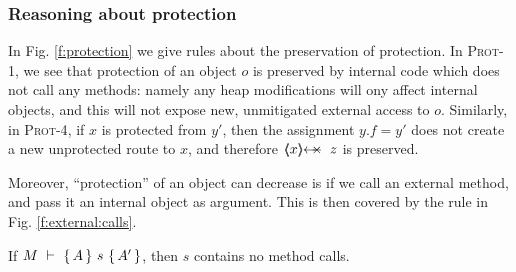 { 

 \subsubsection{Reasoning about protection}


In Fig. \ref{f:protection} we  give rules about the preservation of protection.
In \textsc{Prot-1}, we see that  protection of an object $o$ is preserved by internal code which does not call any methods: namely any heap modifications will
ony affect internal objects, and this will not expose new, unmitigated external access to $o$.
Similarly, in \textsc{Prot-4}, if $x$ is protected from $y'$, then the assignment $y.f=y'$ does not create a new unprotected route  to $x$, and therefore   $\protectedFrom{x}{z}$ is preserved.
}
Moreover, ``protection'' of an object can decrease is if we call an external method, and pass it an internal object as argument. This is then covered by the rule in Fig. \ref{f:external:calls}.

\begin{lemma}
\label{l:no:meth:calls}
If ${M\ \vdash\ \{\,A\, \} \ s\  \{\,A'\, \} }$, then $s$ contains no method calls.
\end{lemma}
  


